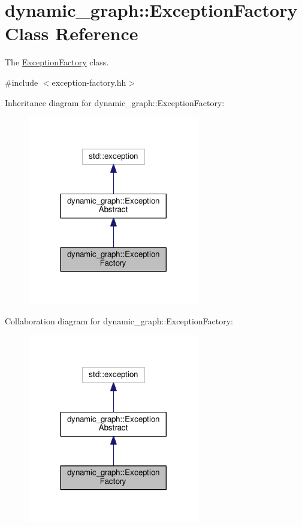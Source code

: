 \hypertarget{classdynamic__graph_1_1ExceptionFactory}{}\section{dynamic\+\_\+graph\+:\+:Exception\+Factory Class Reference}
\label{classdynamic__graph_1_1ExceptionFactory}


The \hyperlink{classdynamic__graph_1_1ExceptionFactory}{Exception\+Factory} class.  




{\ttfamily \#include $<$exception-\/factory.\+hh$>$}



Inheritance diagram for dynamic\+\_\+graph\+:\+:Exception\+Factory\+:
\nopagebreak
\begin{figure}[H]
\begin{center}
\leavevmode
\includegraphics[width=212pt]{classdynamic__graph_1_1ExceptionFactory__inherit__graph}
\end{center}
\end{figure}


Collaboration diagram for dynamic\+\_\+graph\+:\+:Exception\+Factory\+:
\nopagebreak
\begin{figure}[H]
\begin{center}
\leavevmode
\includegraphics[width=212pt]{classdynamic__graph_1_1ExceptionFactory__coll__graph}
\end{center}
\end{figure}
